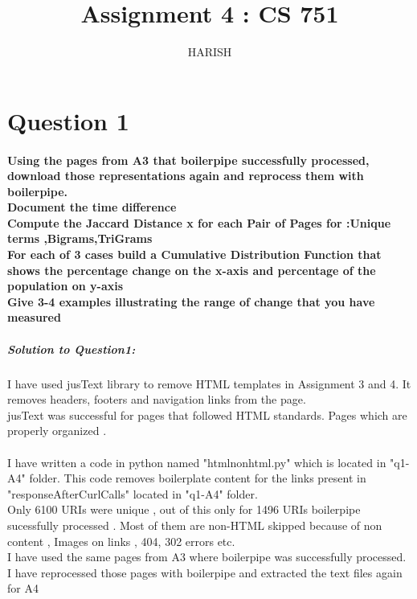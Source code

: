 \documentclass[12pt]{Report}
\begin{document}
\title{Assignment 4 : CS 751 }
\author{HARISH}

\maketitle

\section{Question 1}

\paragraph{ Using the pages from A3 that boilerpipe successfully processed, download those representations again and reprocess them with boilerpipe.\\ Document the time difference \\
Compute the Jaccard Distance x for each Pair of Pages for :Unique terms ,Bigrams,TriGrams\\ For each of 3 cases build a Cumulative Distribution Function that shows the percentage change on the x-axis and percentage of the population on y-axis\\ Give 3-4 examples illustrating the range of change that you have measured}

 

\subparagraph{Solution to Question1: \\}

I have used jusText library to remove HTML templates in Assignment 3 and 4. It removes headers, footers and navigation links from the page.\\
jusText was successful for pages that followed HTML standards. Pages which are properly organized .\\
 \\
I have written a code in python named "htmlnonhtml.py" which is located in "q1-A4" folder. This code removes boilerplate content for the links present in "responseAfterCurlCalls" located in "q1-A4" folder. \\

Only 6100 URIs were unique , out of this only for 1496 URIs boilerpipe sucessfully processed . Most of them are non-HTML skipped because of non content , Images on links , 404, 302 errors etc. \\

I have used the same pages from A3 where boilerpipe was successfully processed. I have reprocessed those pages with boilerpipe and extracted the text files again for A4  \\
\end{document}

